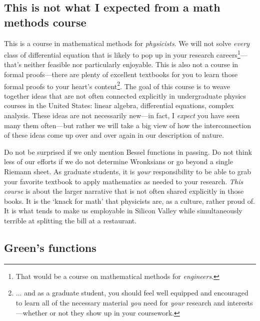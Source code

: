 \subsection{This is not what I expected from a math methods course}

This is a course in mathematical methods for \emph{physicists}. We will not solve \emph{every} class of differential equation that is likely to pop up in your research careers\footnote{That would be a course on mathematical methods for \emph{engineers}.}---that's neither feasible nor particularly enjoyable. 
%
This is also not a course in formal proofs---there are plenty of excellent textbooks for you to learn those formal proofs to your heart's content\footnote{... and as a graduate student, you should feel well equipped and encouraged to learn all of the necessary material \emph{you} need for \emph{your} research and interests---whether or not they show up in your coursework.}. 
%
The goal of this course is to weave together ideas that are not often connected explicitly in undergraduate physics courses in the United States: linear algebra, differential equations, complex analysis. These ideas are not necessarily new---in fact, I \emph{expect} you have seen many them often---but rather we will take a big view of how the interconnection of these ideas come up over and over again in our description of nature.

Do not be surprised if we only mention Bessel functions in passing. Do not think less of our efforts if we do not determine Wronksians or go beyond a single Riemann sheet. As graduate students, it is \emph{your} responsibility to be able to grab your favorite textbook to apply mathematics as needed to your research. \emph{This course} is about the larger narrative that is not often shared explicitly in those books. It is the `knack for math' that physicists are, as a culture, rather proud of. It is what tends to make us employable in Silicon Valley while simultaneously terrible at splitting the bill at a restaurant. 
 
\subsection{Green’s functions}